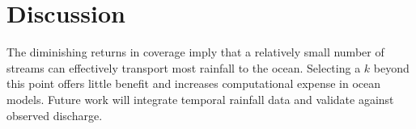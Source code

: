 \section{Discussion}
The diminishing returns in coverage imply that a relatively small number of streams can effectively transport most rainfall to the ocean. Selecting a $k$ beyond this point offers little benefit and increases computational expense in ocean models. Future work will integrate temporal rainfall data and validate against observed discharge.
